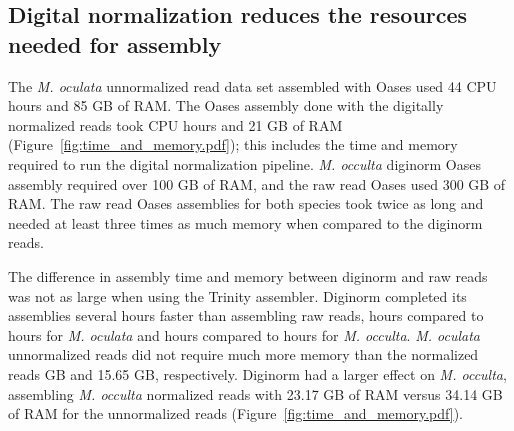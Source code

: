 \subsection{Digital normalization reduces the resources needed for assembly}
 The \textit{M. oculata} unnormalized read data set assembled with Oases used 44 CPU hours and 85 GB of RAM. The Oases assembly done with the digitally normalized reads took  CPU hours and 21 GB of RAM (Figure~\ref{fig:time_and_memory.pdf}); this includes the time and memory required to run the digital normalization pipeline. \textit{M. occulta} diginorm Oases assembly required over 100 GB of RAM, and the raw read Oases used 300 GB of RAM. The raw read Oases assemblies for both species took twice as long and needed at least three times as much memory when compared to the diginorm reads.

The difference in assembly time and memory between diginorm and raw reads was not as large when using the Trinity assembler. Diginorm completed its assemblies several hours faster than assembling raw reads,  hours compared to  hours for \textit{M. oculata} and  hours compared to  hours for \textit{M. occulta}. \textit{M. oculata} unnormalized reads did not require much more memory than the normalized reads GB and 15.65 GB, respectively. Diginorm had a larger effect on \textit{M. occulta}, assembling \textit{M. occulta} normalized reads with 23.17 GB of RAM versus 34.14 GB of RAM for the unnormalized reads (Figure~\ref{fig:time_and_memory.pdf}).

